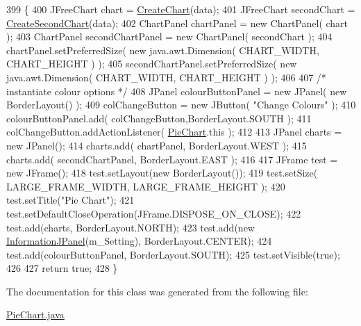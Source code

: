 \begin{DoxyCode}
399                                                                      \{
400         JFreeChart chart = \hyperlink{class_pie_chart_abd00d9a07161c3fbf10bd6f19ec2750d}{CreateChart}(data);
401         JFreeChart secondChart = \hyperlink{class_pie_chart_afc121f4cb3d27f073711e844b7c26377}{CreateSecondChart}(data);
402         ChartPanel chartPanel = \textcolor{keyword}{new} ChartPanel( chart );           
403         ChartPanel secondChartPanel = \textcolor{keyword}{new} ChartPanel( secondChart );  
404         chartPanel.setPreferredSize( \textcolor{keyword}{new} java.awt.Dimension( CHART\_WIDTH, CHART\_HEIGHT ) );
405         secondChartPanel.setPreferredSize( \textcolor{keyword}{new} java.awt.Dimension( CHART\_WIDTH, CHART\_HEIGHT ) );
406                 
407         \textcolor{comment}{/* instantiate colour options */}
408         JPanel colourButtonPanel = \textcolor{keyword}{new} JPanel( \textcolor{keyword}{new} BorderLayout() );
409         colChangeButton = \textcolor{keyword}{new} JButton( \textcolor{stringliteral}{"Change Colours"} );
410         colourButtonPanel.add( colChangeButton,BorderLayout.SOUTH );
411         colChangeButton.addActionListener( \hyperlink{class_pie_chart}{PieChart}.this );
412         
413         JPanel charts = \textcolor{keyword}{new} JPanel();
414         charts.add( chartPanel, BorderLayout.WEST );
415         charts.add( secondChartPanel, BorderLayout.EAST );
416         
417         JFrame test = \textcolor{keyword}{new} JFrame();
418         test.setLayout(\textcolor{keyword}{new} BorderLayout());
419         test.setSize( LARGE\_FRAME\_WIDTH, LARGE\_FRAME\_HEIGHT );
420         test.setTitle(\textcolor{stringliteral}{"Pie Chart"});
421         test.setDefaultCloseOperation(JFrame.DISPOSE\_ON\_CLOSE);
422         test.add(charts, BorderLayout.NORTH);
423         test.add(\textcolor{keyword}{new} \hyperlink{class_information_j_panel}{InformationJPanel}(m\_Setting), BorderLayout.CENTER);
424         test.add(colourButtonPanel, BorderLayout.SOUTH);
425         test.setVisible(\textcolor{keyword}{true});
426         
427         \textcolor{keywordflow}{return} \textcolor{keyword}{true};
428     \}
\end{DoxyCode}


The documentation for this class was generated from the following file\-:\begin{DoxyCompactItemize}
\item 
\hyperlink{_pie_chart_8java}{Pie\-Chart.\-java}\end{DoxyCompactItemize}

